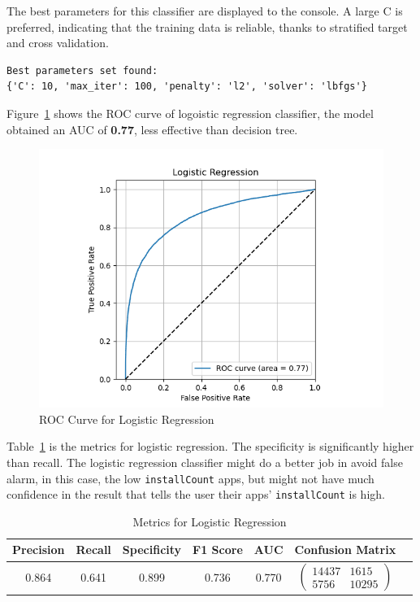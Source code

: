 The best parameters for this classifier are displayed to the console. A large C is preferred, indicating that the training data is reliable, thanks to stratified target and cross validation.

\begin{verbatim}
Best parameters set found:
{'C': 10, 'max_iter': 100, 'penalty': 'l2', 'solver': 'lbfgs'}
\end{verbatim}

Figure~\ref{fig:roc-lr} shows the ROC curve of logoistic regression classifier, the model obtained an AUC of \textbf{0.77}, less effective than decision tree.

\begin{figure}
    \centering
    \includegraphics[width=1\linewidth]{docs//assets/individual_roc_curve_Logistic Regression.png}
    \caption{ROC Curve for Logistic Regression}
    \label{fig:roc-lr}
\end{figure}

Table~\ref{tab:lr} is the metrics for logistic regression. The specificity is significantly higher than recall. The logistic regression classifier might do a better job in avoid false alarm, in this case, the low \texttt{installCount} apps, but might not have much confidence in the result that tells the user their apps' \texttt{installCount} is high.

\begin{table}
\centering
\begin{tabular}{|c|c|c|c|c|c|c}
\hline
\textbf{Precision} & \textbf{Recall} & \textbf{Specificity} & \textbf{F1 Score} & \textbf{AUC} & \textbf{Confusion Matrix} \\
\hline
0.864 & 0.641 & 0.899 & 0.736 & 0.770 & $\left(\begin{array}{cc} 14437 & 1615 \\ 5756 & 10295 \end{array}\right)$ \\ 
\hline
\end{tabular}
\caption{Metrics for Logistic Regression}
\label{tab:lr}
\end{table}

